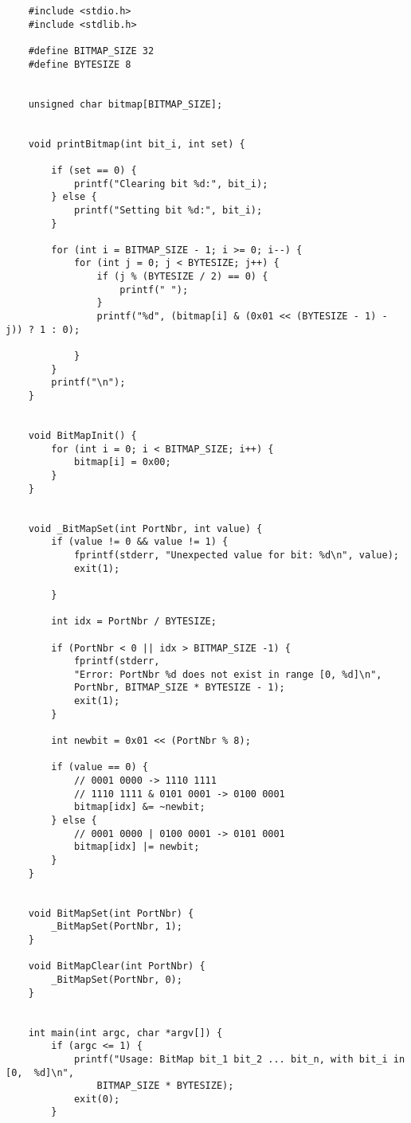 \begin{verbatim}
    #include <stdio.h>
    #include <stdlib.h>

    #define BITMAP_SIZE 32
    #define BYTESIZE 8


    unsigned char bitmap[BITMAP_SIZE];


    void printBitmap(int bit_i, int set) {

        if (set == 0) {
            printf("Clearing bit %d:", bit_i);
        } else {
            printf("Setting bit %d:", bit_i);
        }

        for (int i = BITMAP_SIZE - 1; i >= 0; i--) {
            for (int j = 0; j < BYTESIZE; j++) {
                if (j % (BYTESIZE / 2) == 0) {
                    printf(" ");
                }
                printf("%d", (bitmap[i] & (0x01 << (BYTESIZE - 1) - j)) ? 1 : 0);

            }
        }
        printf("\n");
    }


    void BitMapInit() {
        for (int i = 0; i < BITMAP_SIZE; i++) {
            bitmap[i] = 0x00;
        }
    }


    void _BitMapSet(int PortNbr, int value) {
        if (value != 0 && value != 1) {
            fprintf(stderr, "Unexpected value for bit: %d\n", value);
            exit(1);

        }

        int idx = PortNbr / BYTESIZE;

        if (PortNbr < 0 || idx > BITMAP_SIZE -1) {
            fprintf(stderr,
            "Error: PortNbr %d does not exist in range [0, %d]\n",
            PortNbr, BITMAP_SIZE * BYTESIZE - 1);
            exit(1);
        }

        int newbit = 0x01 << (PortNbr % 8);

        if (value == 0) {
            // 0001 0000 -> 1110 1111
            // 1110 1111 & 0101 0001 -> 0100 0001
            bitmap[idx] &= ~newbit;
        } else {
            // 0001 0000 | 0100 0001 -> 0101 0001
            bitmap[idx] |= newbit;
        }
    }


    void BitMapSet(int PortNbr) {
        _BitMapSet(PortNbr, 1);
    }

    void BitMapClear(int PortNbr) {
        _BitMapSet(PortNbr, 0);
    }


    int main(int argc, char *argv[]) {
        if (argc <= 1) {
            printf("Usage: BitMap bit_1 bit_2 ... bit_n, with bit_i in [0,  %d]\n",
                BITMAP_SIZE * BYTESIZE);
            exit(0);
        }


\end{verbatim}
